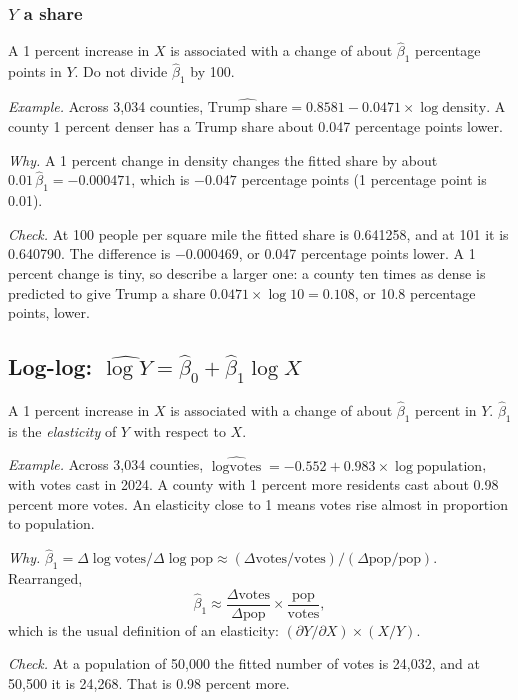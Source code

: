 \documentclass[11pt]{article}
\begin{document}
\subsubsection*{$Y$ a share}

A 1 percent increase in $X$ is associated with a change of about $\hat\beta_1$ percentage points in
$Y$. Do not divide $\hat\beta_1$ by 100.

\emph{Example.} Across 3,034 counties, $\widehat{\text{Trump share}} = 0.8581 - 0.0471\times\log\text{density}$.
A county 1 percent denser has a Trump share about 0.047 percentage points lower.

\emph{Why.} A 1 percent change in density changes the fitted share by about
$0.01\,\hat\beta_1 = -0.000471$, which is $-0.047$ percentage points (1 percentage point is 0.01).

\emph{Check.} At 100 people per square mile the fitted share is 0.641258, and at 101 it is 0.640790. The
difference is $-0.000469$, or 0.047 percentage points lower. A 1 percent change is tiny, so describe a larger
one: a county ten times as dense is predicted to give Trump a share
$0.0471\times\log 10 = 0.108$, or 10.8 percentage points, lower.

\subsection{\texorpdfstring{Log-log: $\widehat{\log Y}=\hat{\beta}_0 + \hat{\beta}_1 \log X$}{Log-log}}

A 1 percent increase in $X$ is associated with a change of about $\hat\beta_1$ percent in $Y$.
$\hat\beta_1$ is the \emph{elasticity} of $Y$ with respect to $X$.

\emph{Example.} Across 3,034 counties, $\widehat{\log \text{votes}} = -0.552 + 0.983\times\log\text{population}$,
with votes cast in 2024. A county with 1 percent more residents cast about 0.98 percent more votes.
An elasticity close to 1 means votes rise almost in proportion to population.

\emph{Why.} $\hat\beta_1 = \Delta\log\text{votes}/\Delta\log\text{pop}
\approx (\Delta\text{votes}/\text{votes})/(\Delta\text{pop}/\text{pop})$. Rearranged,
\[
\hat\beta_1 \approx \frac{\Delta\text{votes}}{\Delta\text{pop}}\times\frac{\text{pop}}{\text{votes}},
\]
which is the usual definition of an elasticity: $(\partial Y/\partial X)\times(X/Y)$.

\emph{Check.} At a population of 50,000 the fitted number of votes is 24,032, and at 50,500 it is
24,268. That is 0.98 percent more.
\end{document}
